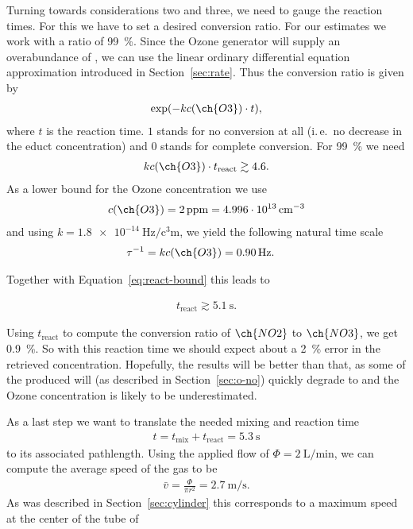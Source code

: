 Turning towards considerations two and three, we need to gauge the
reaction times. For this we have to set a desired conversion
ratio. For our estimates we work with a ratio of \SI{99}{\%}. 
Since the Ozone generator will supply an
overabundance of , we can use the linear ordinary
differential equation approximation introduced in
Section~\ref{sec:rate}. Thus the conversion ratio is
given by
\begin{align*}
  \exp(-kc(\ch{O3})\cdot t),
\end{align*}
where $t$ is the reaction time. $1$ stands for no
conversion at all (i.\,e.\ no decrease in the educt concentration) and
$0$ stands for complete conversion. For \SI{99}{\%} we need
\begin{align}
  kc(\ch{O3}) \cdot t_{\text{react}} \gtrsim 4.6. \label{eq:react-bound}
\end{align}
As a lower bound for the Ozone concentration we use
\begin{align*}
  c(\ch{O3}) = \SI{2}{ppm} = \SI{4.996e13}{\per\cubic\centi\meter} 
\end{align*}
and using $k = \SI{1.8e-14}{\hertz\per\cubic\centi\meter}$, we yield
the following natural time scale
\begin{align*}
  \tau^{-1} & = k c(\ch{O3}) = \SI{0.90}{\hertz}.
\end{align*}

Together with Equation~\eqref{eq:react-bound} this leads to

\begin{align*}
  t_{\text{react}} \gtrsim \SI{5.1}{\second}.
\end{align*}

Using $t_{\text{react}}$ to compute the conversion ratio of
$\ch{NO2}$ to $\ch{NO3}$, we get \SI{0.9}{\%}. So with this reaction
time we should expect about a \SI{2}{\%} error in the retrieved
 concentration. Hopefully, the results will be better than
that, as some of the produced  will (as described in
Section~\ref{sec:o-no}) quickly degrade to  and the Ozone
concentration is likely to be underestimated.

As a last step we want to translate the needed mixing and reaction
time
\begin{align*}
  t = t_{\text{mix}} + t_{\text{react}} = \SI{5.3}{\second}
\end{align*}
to its associated pathlength. Using the applied flow
of $\Phi = \SI{2}{\liter\per\minute}$, we can compute the average
speed of the gas to be
\begin{align*}
  \bar v = \frac{\Phi}{\pi r^2} = \SI{2.7}{\meter\per\second}. 
\end{align*}
As was described in Section~\ref{sec:cylinder} this corresponds to a
maximum speed at the center of the tube of

